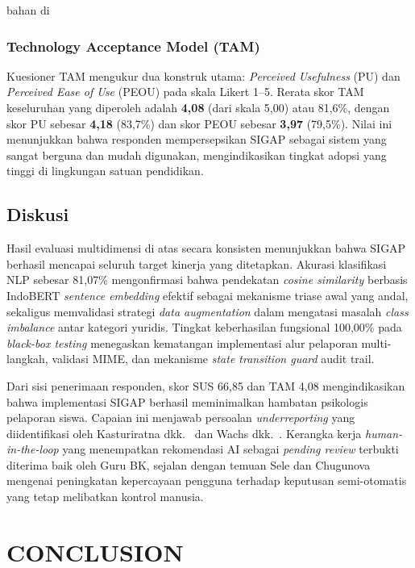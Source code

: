 bahan di\documentclass[conference]{IEEEtran}
\begin{document}
\subsubsection{Technology Acceptance Model (TAM)}
Kuesioner TAM mengukur dua konstruk utama: \textit{Perceived Usefulness} (PU) dan \textit{Perceived Ease of Use} (PEOU) pada skala Likert 1--5. Rerata skor TAM keseluruhan yang diperoleh adalah \textbf{4,08} (dari skala 5,00) atau 81,6\%, dengan skor PU sebesar \textbf{4,18} (83,7\%) dan skor PEOU sebesar \textbf{3,97} (79,5\%). Nilai ini menunjukkan bahwa responden mempersepsikan SIGAP sebagai sistem yang sangat berguna dan mudah digunakan, mengindikasikan tingkat adopsi yang tinggi di lingkungan satuan pendidikan.

\subsection{Diskusi}

Hasil evaluasi multidimensi di atas secara konsisten menunjukkan bahwa SIGAP berhasil mencapai seluruh target kinerja yang ditetapkan. Akurasi klasifikasi NLP sebesar 81,07\% mengonfirmasi bahwa pendekatan \textit{cosine similarity} berbasis IndoBERT \textit{sentence embedding} efektif sebagai mekanisme triase awal yang andal, sekaligus memvalidasi strategi \textit{data augmentation} dalam mengatasi masalah \textit{class imbalance} antar kategori yuridis. Tingkat keberhasilan fungsional 100,00\% pada \textit{black-box testing} menegaskan kematangan implementasi alur pelaporan multi-langkah, validasi MIME, dan mekanisme \textit{state transition guard} audit trail.

Dari sisi penerimaan responden, skor SUS 66,85 dan TAM 4,08 mengindikasikan bahwa implementasi SIGAP berhasil meminimalkan hambatan psikologis pelaporan siswa. Capaian ini menjawab persoalan \textit{underreporting} yang diidentifikasi oleh Kasturiratna dkk.~\cite{kasturiratna2025} dan Wachs dkk.~\cite{wachs2022}. Kerangka kerja \textit{human-in-the-loop} yang menempatkan rekomendasi AI sebagai \textit{pending review} terbukti diterima baik oleh Guru BK, sejalan dengan temuan Sele dan Chugunova~\cite{sele2024} mengenai peningkatan kepercayaan pengguna terhadap keputusan semi-otomatis yang tetap melibatkan kontrol manusia.

\section{CONCLUSION}
\end{document}
